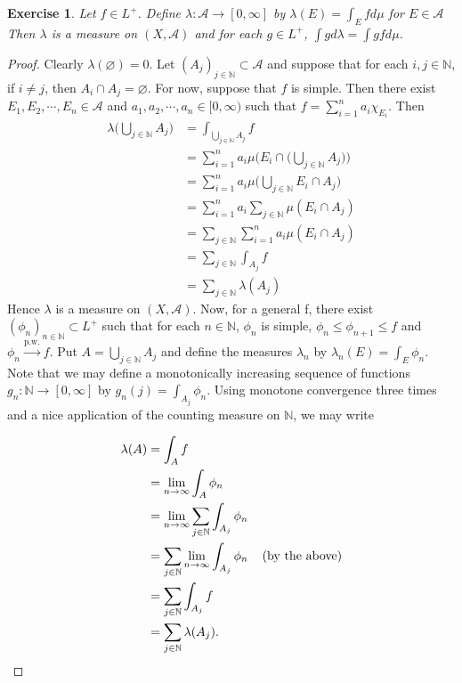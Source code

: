 \documentclass[12pt]{amsart}
\newtheorem{ex}[thm]{Exercise}
\newcommand{\lam}{\lambda}
\newcommand{\N}{\mathbb{N}}
\newcommand{\MA}{\mathcal{A}}
\newcommand{\RG}{[0,\infty]}
\newcommand{\Rg}{[0,\infty)}
\newcommand{\limn}{\lim \limits_{n \rightarrow \infty}}
\begin{document}
\begin{ex}
	Let $f \in L^+$. Define $\lam: \MA \rightarrow \RG$ by $\lam(E) = \int_E f d\mu$ for $E \in \MA$
	Then $\lam$ is a measure on $(X, \MA)$ and for each $g \in L^+$, $\int g d\lam = \int g f d\mu$.
\end{ex}

\begin{proof}
	Clearly $\lam(\varnothing) = 0$. Let $(A_j)_{j \in \N} \subset \MA$ and suppose that for each $i, j \in \N$, if $i \neq j$, then $A_i \cap A_j = \varnothing$. For now, suppose that $f$ is simple. Then there exist $E_1, E_2, \cdots, E_n \in \MA$ and  $a_1, a_2, \cdots, a_n \in \Rg$ such that $f = \sum\limits_{i=1}^n a_i \chi_{E_i}$.  Then 
	\begin{align*}
		\lam\bigg(\bigcup_{j \in \N} A_j\bigg) 
		&= \int_{\bigcup_{j \in \N} A_j} f\\
		&= \sum_{i = 1} ^n a_i\mu\bigg(E_i \cap \bigg(\bigcup_{j \in \N} A_j\bigg)\bigg)\\
		&= \sum_{i = 1} ^n a_i\mu\bigg(\bigcup_{j \in \N} E_i \cap A_j\bigg)\\
		&= \sum_{i = 1} ^n a_i \sum_{j \in \N} \mu(E_i \cap A_j)\\
		&= \sum_{j \in \N} \sum_{i = 1} ^n a_i \mu(E_i \cap A_j)\\
		&= \sum_{j \in \N} \int_{A_j} f\\
		&= \sum_{j \in \N} \lam(A_j)
	\end{align*} 
	Hence $\lam$ is a measure on $(X, \MA)$. Now, for a general f, there exist $(\phi_n)_{n \in \N} \subset L^+$ such that for each $n \in \N$, $\phi_n$ is simple, $\phi_n \leq \phi_{n+1} \leq f$ and $\phi_n \xrightarrow{\text{p.w.}} f$. Put $A = \bigcup_{j \in \N}A_j$ and define the measures $\lam_n$ by $\lam_n(E) = \int_E \phi_n$. Note that we may define a monotonically increasing sequence of functions $g_n: \N \rightarrow \RG$ by $g_n(j) = \int_{A_j} \phi_n$. Using monotone convergence three times and a nice application of the counting measure on $\N$, we may write
	
	\begin{align*}
		\lam(A) 
		&= \int_A f\\
		&= \limn \int_A \phi_n\\
		&= \limn \sum_{j \in \N} \int_{A_j} \phi_n\\
		&= \sum_{j \in \N} \limn \int_{A_j} \phi_n \hspace{4mm} \text{(by the above)}\\
		&= \sum_{j \in \N} \int_{A_j} f\\
		&= \sum_{j \in \N} \lam(A_j).
	\end{align*} 
	

\end{proof}
\end{document}
